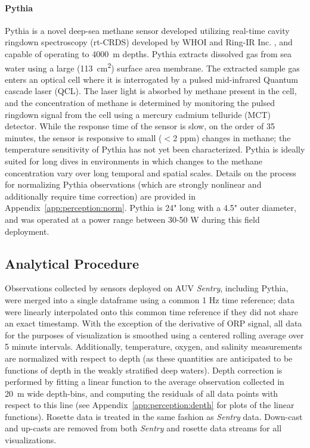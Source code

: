 \paragraph{Pythia}
\label{sec:nopp}
Pythia is a novel deep-sea methane sensor developed utilizing real-time cavity ringdown spectroscopy (rt-CRDS) developed by WHOI \cite{michel2022gas} and Ring-IR Inc. \cite{Harb:12}, and capable of operating to \SI{4000}{\meter} depths. Pythia extracts dissolved gas from sea water using a large (\SI{113}{\centi\meter\squared}) surface area membrane. The extracted sample gas enters an optical cell where it is interrogated by a pulsed mid-infrared Quantum cascade laser (QCL). The laser light is absorbed by methane present in the cell, and the concentration of methane is determined by monitoring the pulsed ringdown signal from the cell using a mercury cadmium telluride (MCT) detector. While the response time of the sensor is slow, on the order of 35 minutes, the sensor is responsive to small ($<$2 ppm) changes in methane; the temperature sensitivity of Pythia has not yet been characterized. Pythia is ideally suited for long dives in environments in which changes to the methane concentration vary over long temporal and spatial scales. Details on the process for normalizing Pythia observations (which are strongly nonlinear and additionally require time correction) are provided in Appendix~\ref{app:perception:norm}. Pythia is 24" long with a 4.5" outer diameter, and was operated at a power range between 30-50 W during this field deployment.

\subsection{Analytical Procedure}
\label{sec:analytical}
Observations collected by sensors deployed on AUV \emph{Sentry}, including Pythia, were merged into a single dataframe using a common 1 Hz time reference; data were linearly interpolated onto this common time reference if they did not share an exact timestamp. With the exception of the derivative of ORP signal, all data for the purposes of visualization is smoothed using a centered rolling average over 5 minute intervals. Additionally, temperature, oxygen, and salinity measurements are normalized with respect to depth (as these quantities are anticipated to be functions of depth in the weakly stratified deep waters). Depth correction is performed by fitting a linear function to the average observation collected in \SI{20}{\meter} wide depth-bins, and computing the residuals of all data points with respect to this line (see Appendix~\ref{app:perception:depth} for plots of the linear functions). Rosette data is treated in the same fashion as \emph{Sentry} data. Down-cast and up-casts are removed from both \emph{Sentry} and rosette data streams for all visualizations.

